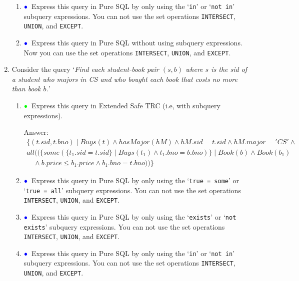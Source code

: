 \documentclass[11pt]{article}
\newcommand{\green}[1]{{\color{green}#1}}
\newcommand{\blue}[1]{{\color{blue}#1}}
\newcommand{\greenbullet}{$\green{\bullet}$}
\newcommand{\bluebullet}{$\blue{\bullet}$}
\begin{document}
\begin{enumerate}[resume]
\begin{enumerate}
    \item  \bluebullet\  Express this query in Pure SQL by only using the `{\tt in}' or `{\tt not in}' subquery expressions.
    You can not use the set operations {\tt INTERSECT}, {\tt UNION}, and {\tt EXCEPT}.
    
    \item    \bluebullet\  Express this query in Pure SQL without using subquery expressions.
    Now you can use the set operations {\tt INTERSECT}, {\tt UNION}, and {\tt EXCEPT}.
    \end{enumerate}

\item \label{queryFour} Consider the query `\emph{Find each student-book pair $(s,b)$ where $s$ is the sid of a student who majors in CS and who bought each book that costs no more than book $b$.}'

    \begin{enumerate}
    \item \greenbullet\  Express this query in Extended Safe TRC (i.e, with subquery expressions).
    
     Answer:
    {\large
\[
\begin{array}{l}
\{(t.sid,t.bno)\mid Buys(t) \land hasMajor(hM) \land hM.sid=t.sid \land hM.major='CS' \land \\ all((\{some(\{ t_{1}.sid=t.sid\} \mid Buys(t_{1}) \land t_{1}.bno=b.bno) \}\mid Book(b)\land Book(b_{1}) \\ \quad \land b.price \leq b_{1}.price \land b_{1}.bno=t.bno))

\}
\end{array}
\]
}
    

     \item \bluebullet\ Express this query in Pure SQL by only using the `{\tt true = some}' or `{\tt true = all}' subquery expressions.
    You can not use the set operations {\tt INTERSECT}, {\tt UNION}, and {\tt EXCEPT}.
    
    \item  \bluebullet\  Express this query in Pure SQL by only using the `{\tt exists}' or `{\tt not exists}' subquery expressions.
    You can not use the set operations {\tt INTERSECT}, {\tt UNION}, and {\tt EXCEPT}.
    
   \item  \bluebullet\  Express this query in Pure SQL by only using the `{\tt in}' or `{\tt not in}' subquery expressions.
    You can not use the set operations {\tt INTERSECT}, {\tt UNION}, and {\tt EXCEPT}.
     

\end{enumerate}
\end{enumerate}
\end{document}
